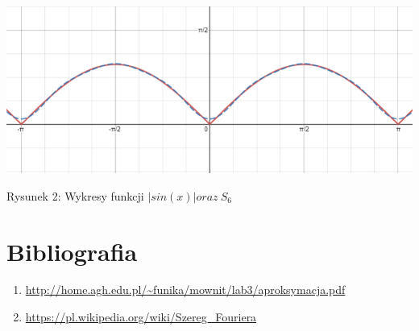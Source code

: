 \documentclass[5]{article}
\begin{document}
\hfil
\includegraphics[scale=0.5]{lab3sin.png} \par
\vspace{3mm}
\hfil{Rysunek 2: Wykresy funkcji $\left | sin(x) \right | oraz \ S_{6} $} \par

\vspace{5mm}


\section{Bibliografia}

\begin{enumerate}
  \item \url{http://home.agh.edu.pl/~funika/mownit/lab3/aproksymacja.pdf}
  \item \url{https://pl.wikipedia.org/wiki/Szereg_Fouriera}
\end{enumerate}
\end{document}
